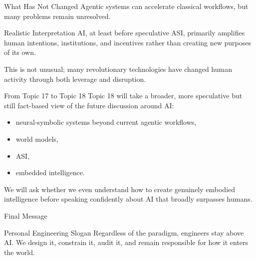 \documentclass[12pt]{beamer}
\begin{document}
\begin{frame}{What Has Not Changed}
  Agentic systems can accelerate classical workflows, but many problems remain unresolved.

  \begin{warningbox}{Realistic Interpretation}
    AI, at least before speculative ASI, primarily amplifies human intentions, institutions, and incentives rather than creating new purposes of its own.
  \end{warningbox}

  This is not unusual; many revolutionary technologies have changed human activity through both leverage and disruption.
\end{frame}

\begin{frame}{From Topic 17 to Topic 18}
  Topic 18 will take a broader, more speculative but still fact-based view of the future discussion around AI:
  \begin{itemize}
    \item neural-symbolic systems beyond current agentic workflows,
    \item world models,
    \item ASI,
    \item embedded intelligence.
  \end{itemize}

  We will ask whether we even understand how to create genuinely embodied intelligence before speaking confidently about AI that broadly surpasses humans.
\end{frame}

\begin{frame}{Final Message}
  \begin{conceptbox}{Personal Engineering Slogan}
    Regardless of the paradigm, engineers stay above AI. We design it, constrain it, audit it, and remain responsible for how it enters the world.
  \end{conceptbox}
\end{frame}
\end{document}
